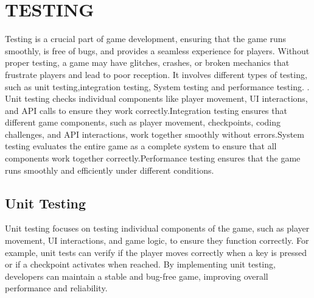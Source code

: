 \chapter{TESTING}
Testing is a crucial part of game development, ensuring that the game runs smoothly, is free of bugs, and provides a seamless experience for players. Without proper testing, a game may have glitches, crashes, or broken mechanics that frustrate players and lead to poor reception. It involves different types of testing, such as unit testing,integration testing, System testing and performance testing. .  
\noindent
Unit testing checks individual components like player movement, UI interactions, and API calls to ensure they work correctly.Integration testing ensures that different game components, such as player movement, checkpoints, coding challenges, and API interactions, work together smoothly without errors.System testing evaluates the entire game as a complete system to ensure that all components work together correctly.Performance testing ensures that the game runs smoothly and efficiently under different conditions.

\section{Unit Testing}
Unit testing focuses on testing individual components of the game, such as player movement, UI interactions, and game logic, to ensure they function correctly. For example, unit tests can verify if the player moves correctly when a key is pressed or if a checkpoint activates when reached. By implementing unit testing, developers can maintain a stable and bug-free game, improving overall performance and reliability.



\renewcommand{\arraystretch}{1.3}

